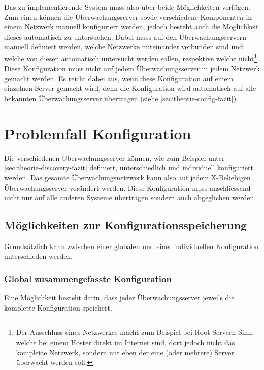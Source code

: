Das zu implementierende System muss also \"uber beide M\"oglichkeiten verf\"ugen. Zum einen k\"onnen die \"Uberwachungsserver sowie verschiedene Komponenten in einem Netzwerk manuell konfiguriert werden, jedoch besteht auch die M\"oglichkeit dieses automatisch zu untersuchen. Dabei muss auf den \"Uberwachungsservern manuell definiert werden, welche Netzwerke miteinander verbunden sind und welche von diesen automatisch untersucht werden sollen, respektive welche nicht\footnote{\label{foot:theorie-discovery-fazit}Der Ausschluss eines Netzwerkes macht zum Beispiel bei Root-Servern Sinn, welche bei einem Hoster direkt im Internet sind, dort jedoch nicht das komplette Netzwerk, sondern nur eben der eine (oder mehrere) Server \"uberwacht werden soll.}. Diese Konfiguration muss nicht auf jedem \"Uberwachungsserver in jedem Netzwerk gemacht werden. Es reicht dabei aus, wenn diese Konfiguration auf einem einzelnen Server gemacht wird, denn die Konfiguration wird automatisch auf alle bekannten \"Uberwachungsserver \"ubertragen (siehe \ref{sec:theorie-config-fazit}).


\section{Problemfall Konfiguration} \label{sec:theorie-config}
Die verschiedenen \"Uberwachungsserver k\"onnen, wie zum Beispiel unter \ref{sec:theorie-discovery-fazit} definiert, unterschiedlich und individuell konfiguriert werden. Das gesamte \"Uberwachungsnetzwerk kann also auf jedem X-Beliebigen \"Uberwachungsserver ver\"andert werden. Diese Konfiguration muss anschliessend nicht nur auf alle anderen Systeme \"ubertragen sondern auch abgeglichen werden.

\subsection{M\"oglichkeiten zur Konfigurationsspeicherung} \label{sec:theorie-config-variants}
Grunds\"atzlich kann zwischen einer globalen und einer individuellen Konfiguration unterschieden werden.

\subsubsection{Global zusammengefasste Konfiguration} \label{sec:theorie-config-variants-global}
Eine M\"oglichkeit besteht darin, dass jeder \"Uberwachungsserver jeweils die komplette Konfiguration speichert.

